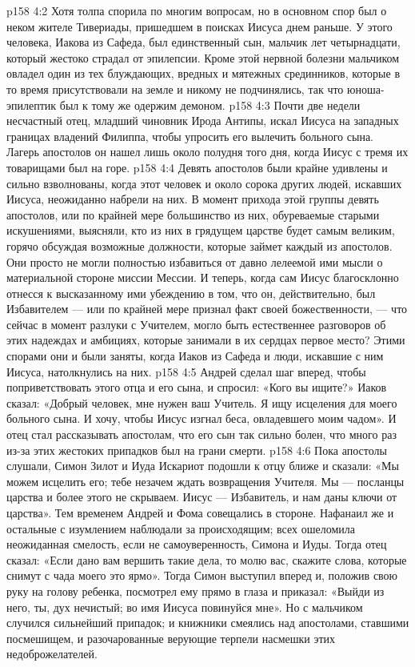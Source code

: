 \vs p158 4:2 Хотя толпа спорила по многим вопросам, но в основном спор был о неком жителе Тивериады, пришедшем в поисках Иисуса днем раньше. У этого человека, Иакова из Сафеда, был единственный сын, мальчик лет четырнадцати, который жестоко страдал от эпилепсии. Кроме этой нервной болезни мальчиком овладел один из тех блуждающих, вредных и мятежных срединников, которые в то время присутствовали на земле и никому не подчинялись, так что юноша\hyp{}эпилептик был к тому же одержим демоном.
\vs p158 4:3 Почти две недели несчастный отец, младший чиновник Ирода Антипы, искал Иисуса на западных границах владений Филиппа, чтобы упросить его вылечить больного сына. Лагерь апостолов он нашел лишь около полудня того дня, когда Иисус с тремя их товарищами был на горе.
\vs p158 4:4 Девять апостолов были крайне удивлены и сильно взволнованы, когда этот человек и около сорока других людей, искавших Иисуса, неожиданно набрели на них. В момент прихода этой группы девять апостолов, или по крайней мере большинство из них, обуреваемые старыми искушениями, выясняли, кто из них в грядущем царстве будет самым великим, горячо обсуждая возможные должности, которые займет каждый из апостолов. Они просто не могли полностью избавиться от давно лелеемой ими мысли о материальной стороне миссии Мессии. И теперь, когда сам Иисус благосклонно отнесся к высказанному ими убеждению в том, что он, действительно, был Избавителем --- или по крайней мере признал факт своей божественности, --- что сейчас в момент разлуки с Учителем, могло быть естественнее разговоров об этих надеждах и амбициях, которые занимали в их сердцах первое место? Этими спорами они и были заняты, когда Иаков из Сафеда и люди, искавшие с ним Иисуса, натолкнулись на них.
\vs p158 4:5 Андрей сделал шаг вперед, чтобы поприветствовать этого отца и его сына, и спросил: «Кого вы ищите?» Иаков сказал: «Добрый человек, мне нужен ваш Учитель. Я ищу исцеления для моего больного сына. И хочу, чтобы Иисус изгнал беса, овладевшего моим чадом». И отец стал рассказывать апостолам, что его сын так сильно болен, что много раз из\hyp{}за этих жестоких припадков был на грани смерти.
\vs p158 4:6 Пока апостолы слушали, Симон Зилот и Иуда Искариот подошли к отцу ближе и сказали: «Мы можем исцелить его; тебе незачем ждать возвращения Учителя. Мы --- посланцы царства и более этого не скрываем. Иисус --- Избавитель, и нам даны ключи от царства». Тем временем Андрей и Фома совещались в стороне. Нафанаил же и остальные с изумлением наблюдали за происходящим; всех ошеломила неожиданная смелость, если не самоуверенность, Симона и Иуды. Тогда отец сказал: «Если дано вам вершить такие дела, то молю вас, скажите слова, которые снимут с чада моего это ярмо». Тогда Симон выступил вперед и, положив свою руку на голову ребенка, посмотрел ему прямо в глаза и приказал: «Выйди из него, ты, дух нечистый; во имя Иисуса повинуйся мне». Но с мальчиком случился сильнейший припадок; и книжники смеялись над апостолами, ставшими посмешищем, и разочарованные верующие терпели насмешки этих недоброжелателей.
